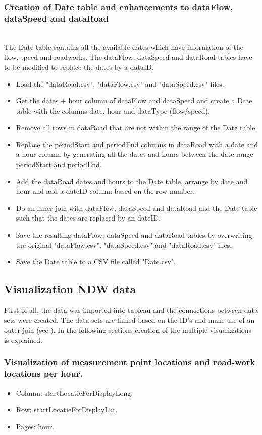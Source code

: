 \documentclass[sigconf]{acmart}
\begin{document}
\subsubsection{Creation of Date table and enhancements to dataFlow, dataSpeed and dataRoad}\hspace*{\fill} \\
The Date table contains all the available dates which have information of the flow, speed and roadworks. The dataFlow, dataSpeed and dataRoad tables have to be modified to replace the dates by a dataID.
\begin{itemize}
    \item Load the "dataRoad.csv", "dataFlow.csv" and "dataSpeed.csv" files.
    \item Get the dates + hour column of dataFlow and dataSpeed and create a Date table with the columns date, hour and dataType (flow/speed).
    \item Remove all rows in dataRoad that are not within the range of the Date table.
    \item Replace the periodStart and periodEnd columns in dataRoad with a date and a hour column by generating all the dates and hours between the date range periodStart and periodEnd.
    \item Add the dataRoad dates and hours to the Date table, arrange by date and hour and add a dateID column based on the row number.
    \item Do an inner join with dataFlow, dataSpeed and dataRoad and the Date table such that the dates are replaced by an dateID.
    \item Save the resulting dataFlow, dataSpeed and dataRoad tables by overwriting the original "dataFlow.csv", "dataSpeed.csv" and "dataRoad.csv" files.
    \item Save the Date table to a CSV file called "Date.csv".
\end{itemize}

\subsection{Visualization NDW data}
First of all, the data was imported into tableau and the connections between data sets were created. The data sets are linked based on the ID's and make use of an outer join (see ). In the following sections creation of the multiple visualizations is explained.

\subsubsection{Visualization of measurement point locations and road-work locations per hour.}\hspace*{\fill}
\begin{itemize}
    \item Column: startLocatieForDisplayLong.
    \item Row: startLocatieForDisplayLat.
    \item Pages: hour.
\end{itemize}
\end{document}
